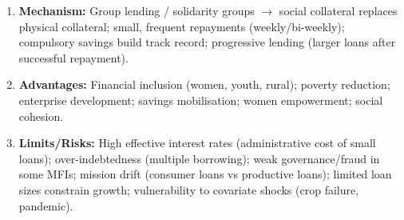 \documentclass[11pt]{article}
\newcommand{\cle}[1]{{\popxbold\color{popdark}#1}}
\begin{document}
\begin{methode}
\begin{enumerate}
\item \textbf{Mechanism:} Group lending / solidarity groups $\rightarrow$ \cle{social collateral} replaces physical collateral; small, frequent repayments (weekly/bi-weekly); compulsory savings build track record; progressive lending (larger loans after successful repayment).
\item \textbf{Advantages:} Financial inclusion (women, youth, rural); poverty reduction; enterprise development; savings mobilisation; women empowerment; social cohesion.
\item \textbf{Limits/Risks:} High effective interest rates (administrative cost of small loans); over-indebtedness (multiple borrowing); weak governance/fraud in some MFIs; mission drift (consumer loans vs productive loans); limited loan sizes constrain growth; vulnerability to covariate shocks (crop failure, pandemic).
\end{enumerate}
\end{methode}
\end{document}
